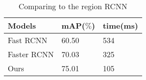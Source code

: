 \begin{table*}[!ht]
    \caption{Comparing to the region RCNN}
    \label{tab:tabOD}
    \setlength{\arrayrulewidth}{1.05 pt}
    \renewcommand{\arraystretch}{1.1}
    \begin{tabular*}{1.0\textwidth}{
        @{
            \extracolsep{\fill}
        }lll
    }
        \hline
        
        Models & mAP($\%$) & time(ms) \\
        
        \hline
        
        Fast RCNN   & 60.50 & 534 \\
        Faster RCNN & 70.03 & 325 \\
        Ours        & 75.01 & 105 \\

        \hline
    \end{tabular*}
\end{table*}
